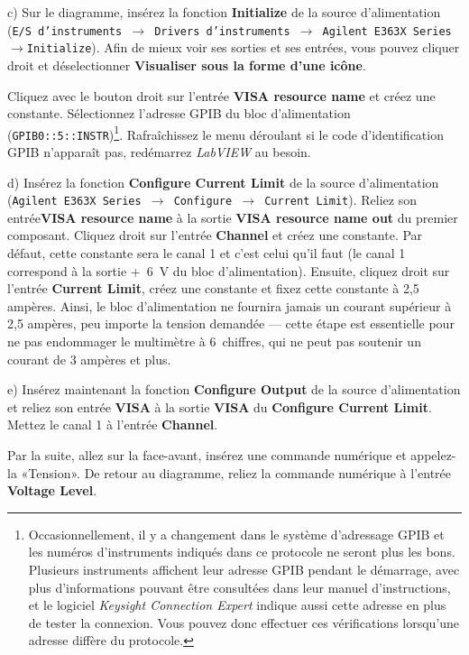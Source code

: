 \documentclass[canadien,12pt,oneside,letterpaper]{article}
\begin{document}
c) Sur le diagramme, insérez la fonction \textbf{Initialize} de la source d'alimentation (\texttt{E/S d'instruments $\rightarrow$ Drivers d'instruments $\rightarrow$ Agilent E363X Series $\rightarrow$\linebreak Initialize}). Afin de mieux voir ses sorties et ses entrées, vous pouvez cliquer droit et déselectionner \textbf{Visualiser sous la forme d'une icône}.

Cliquez avec le bouton droit sur l'entrée \textbf{VISA  resource name} et créez une constante. Sélectionnez l'adresse GPIB du bloc d'alimentation (\verb+GPIB0::5::INSTR+)\footnote{Occasionnellement, il y a changement dans le système d'adressage GPIB et les numéros d'instruments indiqués dans ce protocole ne seront plus les bons. Plusieurs instruments affichent leur adresse GPIB pendant le démarrage, avec plus d'informations pouvant être consultées dans leur manuel d'instructions, et le logiciel \textit{Keysight Connection Expert} indique aussi cette adresse en plus de tester la connexion. Vous pouvez donc effectuer ces vérifications lorsqu'une adresse diffère du protocole.}. Rafraîchissez le menu déroulant si le code d'identification GPIB n'apparaît pas, redémarrez \textit{LabVIEW} au besoin.

d) Insérez la fonction \textbf{Configure Current Limit} de la source d'alimentation (\texttt{Agilent E363X Series $\rightarrow$ Configure $\rightarrow$ Current Limit}). Reliez son entrée\linebreak\textbf{VISA resource name} à la sortie \textbf{VISA resource name out} du premier composant. Cliquez droit sur l'entrée \textbf{Channel} et créez une constante. Par défaut, cette constante sera le canal 1 et c'est celui qu'il faut (le canal 1 correspond à la sortie +~6~V du bloc d'alimentation). Ensuite, cliquez droit sur l'entrée \textbf{Current Limit}, créez une constante et fixez cette constante à 2,5 ampères. Ainsi, le bloc d'alimentation ne fournira jamais un courant supérieur à 2,5 ampères, peu importe la tension demandée --- cette étape est essentielle pour ne pas endommager le multimètre à 6\textonehalf~chiffres, qui ne peut pas soutenir un courant de 3 ampères et plus.

e) Insérez maintenant la fonction \textbf{Configure Output} de la source d'alimentation et reliez son entrée \textbf{VISA} à la sortie \textbf{VISA} du \textbf{Configure Current Limit}. Mettez le canal 1 à l'entrée \textbf{Channel}.

Par la suite, allez sur la face-avant, insérez une commande numérique et appelez-la «Tension». De retour au diagramme, reliez la commande numérique à l'entrée \textbf{Voltage Level}.
\end{document}
